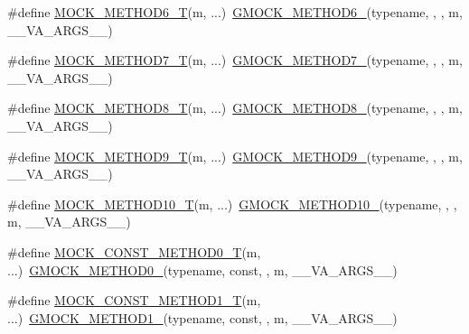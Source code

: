 \begin{DoxyCompactItemize}
\item 
\#define \hyperlink{gmock-generated-function-mockers_8h_a0d16357a0043d36b167a1c42ef33f672}{M\+O\+C\+K\+\_\+\+M\+E\+T\+H\+O\+D6\+\_\+T}(m, ...)~\hyperlink{gmock-generated-function-mockers_8h_ad0ca7f6973a076d0af4c953f8ed91842}{G\+M\+O\+C\+K\+\_\+\+M\+E\+T\+H\+O\+D6\+\_\+}(typename, , , m, \+\_\+\+\_\+\+V\+A\+\_\+\+A\+R\+G\+S\+\_\+\+\_\+)
\item 
\#define \hyperlink{gmock-generated-function-mockers_8h_a31bdd1d1448052f4122ecebf937a8f44}{M\+O\+C\+K\+\_\+\+M\+E\+T\+H\+O\+D7\+\_\+T}(m, ...)~\hyperlink{gmock-generated-function-mockers_8h_ab98a8399ba62b53b375c2807f4d39d2f}{G\+M\+O\+C\+K\+\_\+\+M\+E\+T\+H\+O\+D7\+\_\+}(typename, , , m, \+\_\+\+\_\+\+V\+A\+\_\+\+A\+R\+G\+S\+\_\+\+\_\+)
\item 
\#define \hyperlink{gmock-generated-function-mockers_8h_aa7e6573bb6a57f2a2d3c2875caeffaa3}{M\+O\+C\+K\+\_\+\+M\+E\+T\+H\+O\+D8\+\_\+T}(m, ...)~\hyperlink{gmock-generated-function-mockers_8h_aa84a36427c44505207b7cad5dec7ad67}{G\+M\+O\+C\+K\+\_\+\+M\+E\+T\+H\+O\+D8\+\_\+}(typename, , , m, \+\_\+\+\_\+\+V\+A\+\_\+\+A\+R\+G\+S\+\_\+\+\_\+)
\item 
\#define \hyperlink{gmock-generated-function-mockers_8h_a838c68cbdf422cfc703b83daf1d1f1e1}{M\+O\+C\+K\+\_\+\+M\+E\+T\+H\+O\+D9\+\_\+T}(m, ...)~\hyperlink{gmock-generated-function-mockers_8h_aa820171a19cc587c247dbe05cbffc55f}{G\+M\+O\+C\+K\+\_\+\+M\+E\+T\+H\+O\+D9\+\_\+}(typename, , , m, \+\_\+\+\_\+\+V\+A\+\_\+\+A\+R\+G\+S\+\_\+\+\_\+)
\item 
\#define \hyperlink{gmock-generated-function-mockers_8h_aa28723ba52933b5ea9a4ffa1a73d15e1}{M\+O\+C\+K\+\_\+\+M\+E\+T\+H\+O\+D10\+\_\+T}(m, ...)~\hyperlink{gmock-generated-function-mockers_8h_a81a48223a8771de36ef92ac6d56f6e81}{G\+M\+O\+C\+K\+\_\+\+M\+E\+T\+H\+O\+D10\+\_\+}(typename, , , m, \+\_\+\+\_\+\+V\+A\+\_\+\+A\+R\+G\+S\+\_\+\+\_\+)
\item 
\#define \hyperlink{gmock-generated-function-mockers_8h_a5fc82f3de9d5e83b0a6bb6cda98a8887}{M\+O\+C\+K\+\_\+\+C\+O\+N\+S\+T\+\_\+\+M\+E\+T\+H\+O\+D0\+\_\+T}(m, ...)~\hyperlink{gmock-generated-function-mockers_8h_ae0d290ffa58d7c624b2e3487ba1252f4}{G\+M\+O\+C\+K\+\_\+\+M\+E\+T\+H\+O\+D0\+\_\+}(typename, const, , m, \+\_\+\+\_\+\+V\+A\+\_\+\+A\+R\+G\+S\+\_\+\+\_\+)
\item 
\#define \hyperlink{gmock-generated-function-mockers_8h_a46dfe8631eee86b15a79aff8a2866621}{M\+O\+C\+K\+\_\+\+C\+O\+N\+S\+T\+\_\+\+M\+E\+T\+H\+O\+D1\+\_\+T}(m, ...)~\hyperlink{gmock-generated-function-mockers_8h_a1bc0012d62440dda77208dabdf4925c9}{G\+M\+O\+C\+K\+\_\+\+M\+E\+T\+H\+O\+D1\+\_\+}(typename, const, , m, \+\_\+\+\_\+\+V\+A\+\_\+\+A\+R\+G\+S\+\_\+\+\_\+)

\end{DoxyCompactItemize}

